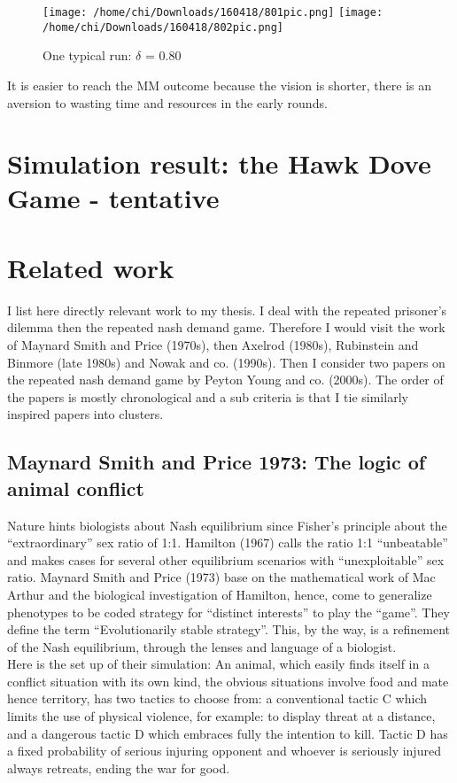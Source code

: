 \documentclass[12.5pt]{report}
\begin{document}
\begin{figure}
\texttt{[image: /home/chi/Downloads/160418/801pic.png]}
\texttt{[image: /home/chi/Downloads/160418/802pic.png]}

\caption{One typical run: $\delta$ = 0.80}
\end{figure}

It is easier to reach the MM outcome because the vision is shorter, there is an aversion to wasting time and resources in the early rounds.

\chapter{Simulation result: the Hawk Dove Game - tentative}


\chapter{Related work}
I list here directly relevant work to my thesis. I deal with the repeated prisoner’s dilemma then the repeated nash demand game. Therefore I would visit the work of Maynard Smith and Price (1970s), then Axelrod (1980s), Rubinstein and Binmore (late 1980s) and Nowak and co. (1990s). Then I consider two papers on the repeated nash demand game by Peyton Young and co. (2000s). The order of the papers is mostly chronological and a sub criteria is that I tie similarly inspired papers into clusters.

\section{Maynard Smith and Price 1973: The logic of animal conflict}

Nature hints biologists about Nash equilibrium since Fisher’s principle about the “extraordinary” sex ratio of 1:1. Hamilton (1967) calls the ratio 1:1 “unbeatable” and makes cases for several other equilibrium scenarios with “unexploitable” sex ratio. Maynard Smith and Price (1973) base on the mathematical work of Mac Arthur and the biological investigation of Hamilton, hence, come to generalize phenotypes to be coded strategy for “distinct interests” to play the “game”. They define the term “Evolutionarily stable strategy”. This, by the way, is a refinement of the Nash equilibrium, through the lenses and language of a biologist.\\

Here is the set up of their simulation:
An animal, which easily finds itself in a conflict situation with its own kind, the obvious situations involve food and mate hence territory, has two tactics to choose from: a conventional tactic C which limits the use of physical violence, for example: to display threat at a distance, and a dangerous tactic D which embraces fully the intention to kill. 
 Tactic D has a fixed probability of serious injuring opponent and whoever is seriously injured always retreats, ending the war for good.\\
\end{document}
